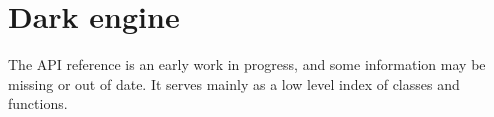 \chapter{Dark engine}
\hypertarget{index}{}\label{index}
The API reference is an early work in progress, and some information may be missing or out of date. It serves mainly as a low level index of  classes and functions. 